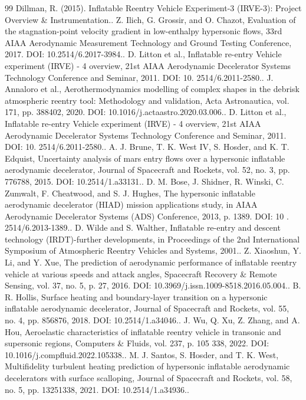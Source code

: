 \documentclass[conference]{IEEEtran}
\begin{document}
\begin{sloppypar}
\begin{thebibliography}{99}
 Dillman, R. (2015). Inflatable Reentry Vehicle Experiment-3 (IRVE-3): Project Overview \& Instrumentation..
 Z. Ilich, G. Grossir, and O. Chazot, Evaluation of the stagnation-point velocity gradient in low-enthalpy hypersonic flows, 33rd AIAA Aerodynamic Measurement Technology and Ground Testing Conference, 2017. DOI: 10.2514/6.2017-3984..
 D. Litton et al., Inflatable re-entry Vehicle experiment (IRVE) - 4 overview, 21st AIAA Aerodynamic Decelerator Systems Technology Conference and Seminar, 2011. DOI: 10. 2514/6.2011-2580..
 J. Annaloro et al., Aerothermodynamics modelling of complex shapes in the debrisk atmospheric reentry tool: Methodology and validation, Acta Astronautica, vol. 171, pp. 388402, 2020. DOI: 10.1016/j.actaastro.2020.03.006..
 D. Litton et al., Inflatable re-entry Vehicle experiment (IRVE) - 4 overview, 21st AIAA Aerodynamic Decelerator Systems Technology Conference and Seminar, 2011. DOI: 10. 2514/6.2011-2580..
 A. J. Brune, T. K. West IV, S. Hosder, and K. T. Edquist, Uncertainty analysis of mars entry flows over a hypersonic inflatable aerodynamic decelerator, Journal of Spacecraft and Rockets, vol. 52, no. 3, pp. 776788, 2015. DOI: 10.2514/1.a33131..
 D. M. Bose, J. Shidner, R. Winski, C. Zumwalt, F. Cheatwood, and S. J. Hughes, The hypersonic inflatable aerodynamic decelerator (HIAD) mission applications study, in AIAA Aerodynamic Decelerator Systems (ADS) Conference, 2013, p. 1389. DOI: 10 . 2514/6.2013-1389..
 D. Wilde and S. Walther, Inflatable re-entry and descent technology (IRDT)-further developments, in Proceedings of the 2nd International Symposium of Atmospheric Reentry Vehicles and Systems, 2001..
 Z. Xiaoshun, Y. Li, and Y. Xue, The prediction of aerodynamic performance of inflatable reentry vehicle at various speeds and attack angles, Spacecraft Recovery \& Remote Sensing, vol. 37, no. 5, p. 27, 2016. DOI: 10.3969/j.issn.1009-8518.2016.05.004..
 B. R. Hollis, Surface heating and boundary-layer transition on a hypersonic inflatable aerodynamic decelerator, Journal of Spacecraft and Rockets, vol. 55, no. 4, pp. 856876, 2018. DOI: 10.2514/1.a34046..
 J. Wu, Q. Xu, Z. Zhang, and A. Hou, Aeroelastic characteristics of inflatable reentry vehicle in transonic and supersonic regions, Computers \& Fluids, vol. 237, p. 105 338, 2022. DOI: 10.1016/j.compfluid.2022.105338..
 M. J. Santos, S. Hosder, and T. K. West, Multifidelity turbulent heating prediction of hypersonic inflatable aerodynamic decelerators with surface scalloping, Journal of Spacecraft and Rockets, vol. 58, no. 5, pp. 13251338, 2021. DOI: 10.2514/1.a34936..

\end{thebibliography}
\end{sloppypar}
\end{document}
